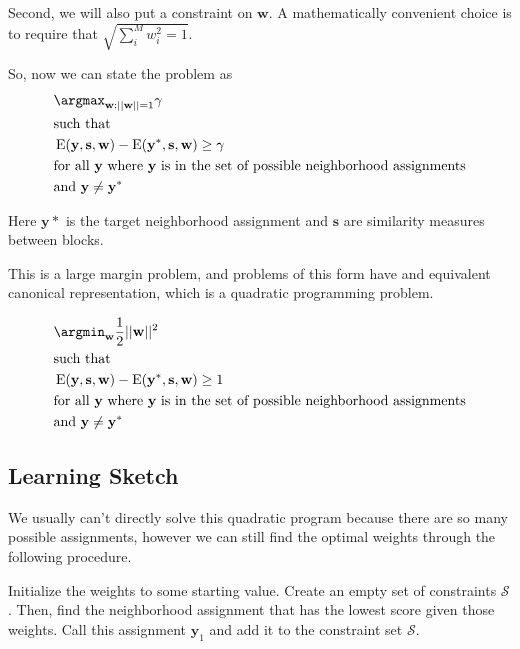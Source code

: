 Second, we will also put a constraint on $\mathbf{w}$. A
mathematically convenient choice is to require that $\sqrt{\sum_i^M w_i^2 = 1}$.

So, now we can state the problem as 
%
\begin{align*}
&\argmax_{\mathbf{w}:||\mathbf{w}||=1} \mathbf{\gamma} \\
&\text{such that} \\
&\operatorname{E}(\mathbf{y}, \mathbf{s}, \mathbf{w})
- \operatorname{E}(\mathbf{y}^*, \mathbf{s}, \mathbf{w}) \geq \gamma\\ 
&\text{for all } \mathbf{y} \text{ where } \mathbf{y} \text{ is in the set of
  possible neighborhood assignments}\\
&\text{and } \mathbf{y} \neq \mathbf{y}^*
\end{align*}
%

Here $\mathbf{y}*$ is the target neighborhood assignment and $\mathbf{s}$
are similarity measures between blocks. 

This is a large margin problem, and problems of this form have and
equivalent canonical representation, which is a quadratic programming
problem.

%
\begin{align*}
&\argmin_{\mathbf{w}} \frac{1}{2}||\mathbf{w}||^2 \\
&\text{such that} \\
&\operatorname{E}(\mathbf{y}, \mathbf{s}, \mathbf{w})
- \operatorname{E}(\mathbf{y}^*, \mathbf{s}, \mathbf{w}) \geq 1 \\ 
&\text{for all } \mathbf{y} \text{ where } \mathbf{y} \text{ is in the set of
  possible neighborhood assignments}\\
&\text{and } \mathbf{y} \neq \mathbf{y}^*
\end{align*}


\subsection*{Learning Sketch}
We usually can't directly solve this quadratic program because there
are so many possible assignments, however we can still find the
optimal weights through the following procedure.

Initialize the weights to some starting value. Create an empty set of
constraints $\mathcal{S}$. Then, find the neighborhood assignment that
has the lowest score given those weights. Call this assignment
$\mathbf{y}_1$ and add it to the constraint set $\mathcal{S}$.

